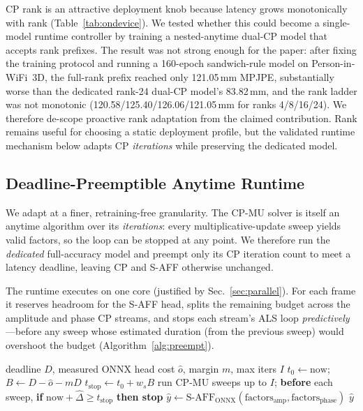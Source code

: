 \documentclass[10pt,conference]{IEEEtran}
\begin{document}
CP rank is an attractive deployment knob because latency grows monotonically with rank (Table~\ref{tab:ondevice}). We tested whether this could become a single-model runtime controller by training a nested-anytime dual-CP model that accepts rank prefixes. The result was not strong enough for the paper: after fixing the training protocol and running a 160-epoch sandwich-rule model on Person-in-WiFi~3D, the full-rank prefix reached only 121.05\,mm MPJPE, substantially worse than the dedicated rank-24 dual-CP model's 83.82\,mm, and the rank ladder was not monotonic (120.58/125.40/126.06/121.05\,mm for ranks 4/8/16/24). We therefore de-scope proactive rank adaptation from the claimed contribution. Rank remains useful for choosing a static deployment profile, but the validated runtime mechanism below adapts CP \emph{iterations} while preserving the dedicated model.

\subsection{Deadline-Preemptible Anytime Runtime}
\label{sec:preempt}

We adapt at a finer, retraining-free granularity. The CP-MU solver is itself an anytime algorithm over its \emph{iterations}: every multiplicative-update sweep yields valid factors, so the loop can be stopped at any point. We therefore run the \emph{dedicated} full-accuracy model and preempt only its CP iteration count to meet a latency deadline, leaving CP and S-AFF otherwise unchanged.

The runtime executes on one core (justified by Sec.~\ref{sec:parallel}). For each frame it reserves headroom for the S-AFF head, splits the remaining budget across the amplitude and phase CP streams, and stops each stream's ALS loop \emph{predictively}---before any sweep whose estimated duration (from the previous sweep) would overshoot the budget (Algorithm~\ref{alg:preempt}).

\begin{algorithm}[t]
\caption{Deadline-preemptible anytime frame inference}
\label{alg:preempt}
\begin{algorithmic}[1]
\Require deadline $D$, measured ONNX head cost $\hat{o}$, margin $m$, max iters $I$
\State $t_0 \gets \mathrm{now}$;\quad $B \gets D - \hat{o} - mD$ 
  \State $t_\text{stop} \gets t_0 + w_s B$ 
  \State run CP-MU sweeps up to $I$; \textbf{before} each sweep, \textbf{if} $\mathrm{now}+\hat{\Delta} \ge t_\text{stop}$ \textbf{then stop} 
\EndFor
\State $\hat{y} \gets \mathrm{S\text{-}AFF}_\text{ONNX}(\text{factors}_\text{amp},\text{factors}_\text{phase})$
\State \Return $\hat{y}$
\end{algorithmic}
\end{algorithm}
\end{document}
